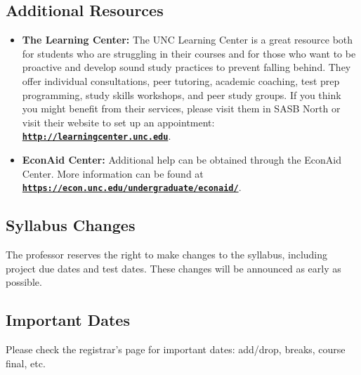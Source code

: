 \documentclass[11pt]{article}
\begin{document}
\subsection*{Additional Resources}
\begin{itemize}

	\item \textbf{The Learning Center:} The UNC Learning Center is a great resource both for students who are struggling in their courses and for those who want to be proactive and develop sound study practices to prevent falling behind. They offer individual consultations, peer tutoring, academic coaching, test prep programming, study skills workshops, and peer study groups. If you think you might benefit from their services, please visit them in SASB North or visit their website to set up an appointment: \href{http://learningcenter.unc.edu}{\tt\bf http://learningcenter.unc.edu}. 
	
	\item \textbf{EconAid Center:} Additional help can be obtained through the EconAid Center. More information can be found at \href{https://econ.unc.edu/undergraduate/econaid/}{\tt\bf https://econ.unc.edu/undergraduate/econaid/}.
\end{itemize}


\subsection*{Syllabus Changes}
The professor reserves the right to make changes to the syllabus, including project due dates and test dates. These changes will be announced as early as possible.


\subsection*{Important Dates}   
Please check the registrar's page for important dates: add/drop, breaks, course final, etc.
\end{document}
